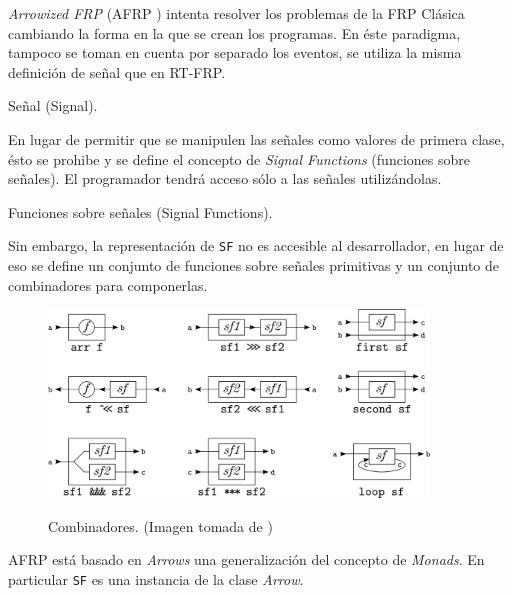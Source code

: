 
  \textit{Arrowized FRP} (AFRP
\cite{nilsson2002:arrows} \cite{hudak2002:arrows}) intenta
resolver los problemas de la FRP Clásica cambiando la forma
en la que se crean los programas.
  En éste paradigma, tampoco se toman en cuenta por separado los
eventos, se utiliza la misma definición de señal que en RT-FRP.

\begin{definicion}
  Señal (Signal).
\end{definicion}

  En lugar de permitir que se manipulen las señales como valores
de primera clase, ésto se prohibe y se define el concepto de
\textit{Signal Functions} (funciones sobre señales). El programador
tendrá acceso sólo a las señales utilizándolas.

\begin{definicion}
  Funciones sobre señales (Signal Functions).
\end{definicion}

  Sin embargo, la representación de \texttt{SF} no es accesible al
desarrollador, en lugar de eso se define un conjunto de funciones
sobre señales primitivas y un conjunto de combinadores
 para componerlas.

\begin{figure}[h]
\begin{center}
  \caption{Combinadores. (Imagen tomada de \cite{yampa})}
\includegraphics[width=0.9\textwidth]{graphs/yampasf.png}
\label{fig:arrowcombinators}
\end{center}
\end{figure}

  AFRP está basado en \textit{Arrows} \cite{hughes1998:arrows}
una generalización del concepto de \textit{Monads}. En particular
\texttt{SF} es una instancia de la clase \textit{Arrow}.


